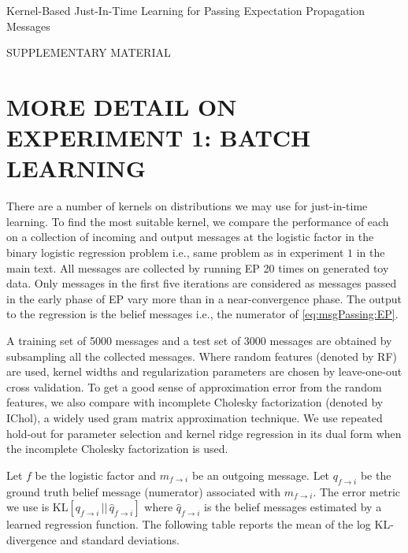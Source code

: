 \documentclass[english]{article}
\theoremstyle{plain}
\theoremstyle{plain}
\newcommand{\factor}{f}				%
\begin{document}
{\Large Kernel-Based Just-In-Time Learning for Passing Expectation Propagation
Messages}

{\large SUPPLEMENTARY MATERIAL}
\section{MORE DETAIL ON EXPERIMENT 1: BATCH LEARNING }
\label{sec:batch_learning_detail}

There are a number of kernels on distributions we may use for just-in-time learning.
To find the most suitable kernel, we compare the performance of each on a 
collection of incoming and output
messages at the logistic factor in the binary logistic regression problem i.e., 
same problem as in experiment $1$ in the main text.
All messages are collected by running EP 20 times on generated toy data. 
Only messages in the first five iterations are considered as messages passed in 
the early phase of EP vary more than in a near-convergence phase.
The output to the regression is the belief messages i.e., the numerator of \eqref{eq:msgPassing:EP}. 

A training set of 5000 messages and a test set of 3000 messages are obtained by 
subsampling all the collected messages. 
Where random features (denoted by RF) are used, kernel widths 
and regularization parameters are chosen by leave-one-out cross validation.
To get a good sense of approximation error from the random features, we also 
compare with incomplete Cholesky factorization (denoted by IChol), a widely used 
gram matrix approximation technique. We use repeated hold-out for parameter selection 
and kernel ridge regression in its dual form when the incomplete Cholesky 
factorization is used. 

Let $\factor$ be the logistic factor and $m_{\factor \rightarrow i}$ be an outgoing message. 
Let $q_{\factor \rightarrow i}$ be the ground truth belief message (numerator) associated with 
$m_{\factor\rightarrow i}$. The error metric we use is 
$\mathrm{KL}[q_{\factor \rightarrow i}\,||\, \hat{q}_{\factor \rightarrow i}]$
where  $\hat{q}_{\factor \rightarrow i}$ is the belief messages estimated by a learned 
regression function. The following table reports the mean of the log KL-divergence 
and standard deviations.
\end{document}
